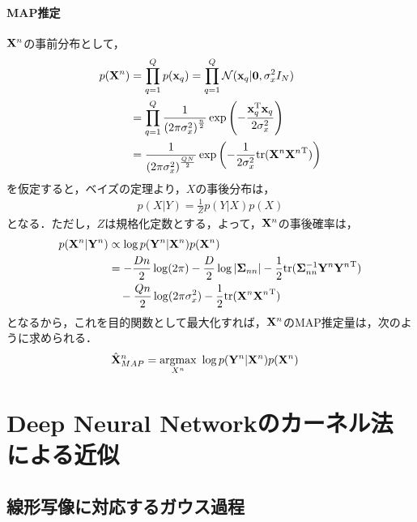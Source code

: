 \documentclass[11pt,a4j]{article}
\begin{document}
        \paragraph{MAP推定}
          ${\bf X}^n$の事前分布として，
          \begin{align}
            p({\bf X}^n) 
            &= \prod_{q=1}^{Q} p({\bf x}_q) = \prod_{q=1}^{Q} \mathcal{N}({\bf x}_q | {\bf 0}, \sigma_x^2 I_N) \\
            &= \prod_{q=1}^{Q} \frac{1}{{(2 \pi {\sigma_x^2} )}^{\frac{n}{2}}} \exp \left( - \frac{ {\bf x}_q^{\mathrm{T}} {\bf x}_q }{2 \sigma_x^2} \right) \\
            &= \frac{1}{{(2 \pi {\sigma_x^2} )}^{\frac{QN}{2}}} \exp \left( -\frac{1}{2 \sigma_x^2} {\rm tr} ({{\bf X}^n}{{\bf X}^n}^{\mathrm{T}}) \right) \\
          \end{align}
          を仮定すると，ベイズの定理より，$X$の事後分布は，
          \begin{align}
            p(X|Y) = \frac{1}{Z} p(Y|X)p(X)
          \end{align}
          となる．ただし，$Z$は規格化定数とする，よって，${\bf X}^n$の事後確率は，
          \begin{align}
            p({\bf X}^n|{\bf Y}^n) 
            &\propto \log p({\bf Y}^n | {\bf X}^n) p({\bf X}^n) \\
            &= -\frac{Dn}{2} \log (2 \pi) - \frac{D}{2} \log |{\bf \Sigma}_{nn}| - \frac{1}{2} {\rm tr} ({\bf \Sigma}_{nn}^{-1} {{\bf Y}^n}{{\bf Y}^n}^{\mathrm{T}}) \\
            &\hspace{1em} -\frac{Qn}{2} \log (2 \pi \sigma_x^2) - \frac{1}{2} {\rm tr} ({{\bf X}^n}{{\bf X}^n}^{\mathrm{T}})
          \end{align}
          となるから，これを目的関数として最大化すれば，${\bf X}^n$のMAP推定量は，次のように求められる．
          \begin{align}
            \hat{\bf X}^{n}_{MAP} &= \underset{X^n}{\rm argmax} ~ \log p({\bf Y}^n | {\bf X}^n) p({\bf X}^n) 
          \end{align}

  \section{Deep Neural Networkのカーネル法による近似}
    \subsection{線形写像に対応するガウス過程}
\end{document}
